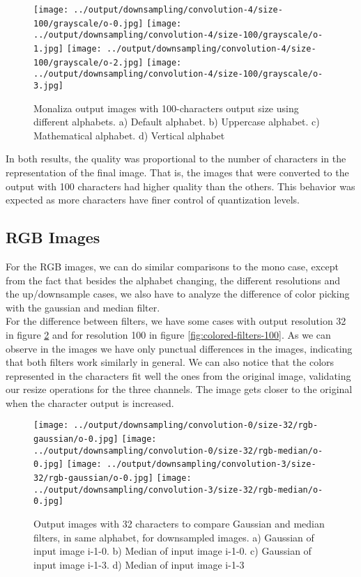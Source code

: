 \documentclass[]{IEEEtran}
\begin{document}
\begin{figure}[H]
    \centering
    \texttt{[image: ../output/downsampling/convolution-4/size-100/grayscale/o-0.jpg]}
    \texttt{[image: ../output/downsampling/convolution-4/size-100/grayscale/o-1.jpg]}
    \texttt{[image: ../output/downsampling/convolution-4/size-100/grayscale/o-2.jpg]}
    \texttt{[image: ../output/downsampling/convolution-4/size-100/grayscale/o-3.jpg]}
    \caption{Monaliza output images with 100-characters output size using different alphabets. a) Default alphabet. b) Uppercase alphabet. c) Mathematical alphabet. d)
    Vertical alphabet}
    \label{fig:grayscale-monalisa}
\end{figure}

In both results, the quality was proportional to the number of characters in the representation of the final image. That is, the images that were converted to the output with 100 characters had higher quality than the others. This behavior was expected as more characters have finer control of quantization levels.


\subsection{RGB Images}

For the RGB images, we can do similar comparisons to the mono case, except from the fact that besides the alphabet changing, the different resolutions and the up/downsample cases, we also have to analyze the difference of color picking with the gaussian and median filter. 
\\For the difference between filters, we have some cases with output resolution 32 in figure \ref{fig:colored-filters-32} and for resolution 100 in figure \ref{fig:colored-filters-100}. As we can observe in the images we have only punctual differences in the images, indicating that both filters work similarly in general. We can also notice that the colors represented in the characters fit well the ones from the original image, validating our resize operations for the three channels. The image gets closer to the original when the character output is increased.

\begin{figure}[H]
    \centering
    \texttt{[image: ../output/downsampling/convolution-0/size-32/rgb-gaussian/o-0.jpg]}
    \texttt{[image: ../output/downsampling/convolution-0/size-32/rgb-median/o-0.jpg]}
    \texttt{[image: ../output/downsampling/convolution-3/size-32/rgb-gaussian/o-0.jpg]}
    \texttt{[image: ../output/downsampling/convolution-3/size-32/rgb-median/o-0.jpg]}
    \caption{Output images with 32 characters to compare Gaussian and median filters, in same alphabet, for downsampled images. a) Gaussian of input image i-1-0. b) Median of input image i-1-0. c) Gaussian of input image i-1-3. d) Median of input image i-1-3}
    \label{fig:colored-filters-32}
\end{figure}
\end{document}
